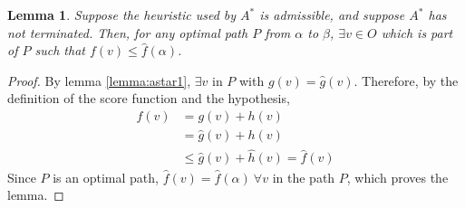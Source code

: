 \documentclass[12pt]{report}
\newtheorem{lemma}[theorem]{Lemma}
\begin{document}
\begin{lemma}
\label{lemma:astar2}
Suppose the heuristic used by $A^*$ is admissible, and suppose $A^*$ has not terminated. Then, for any optimal path $P$ from $\alpha$ to $\beta$, $\exists v \in O$ which is part of $P$ such that $f(v) \leq \hat{f}(\alpha)$.
\end{lemma}
\begin{proof}
By lemma \ref{lemma:astar1}, $\exists v$ in $P$ with $g(v) = \hat{g}(v)$. Therefore, by the definition of the score function and the hypothesis,
\begin{align*}
f(v) &= g(v) + h(v)\\
&= \hat{g}(v) + h(v)\\
&\leq \hat{g}(v) + \hat{h}(v) = \hat{f}(v)
\end{align*}
Since $P$ is an optimal path, $\hat{f}(v) = \hat{f}(\alpha) \  \forall v$ in the path $P$, which proves the lemma.
\end{proof}
\end{document}
